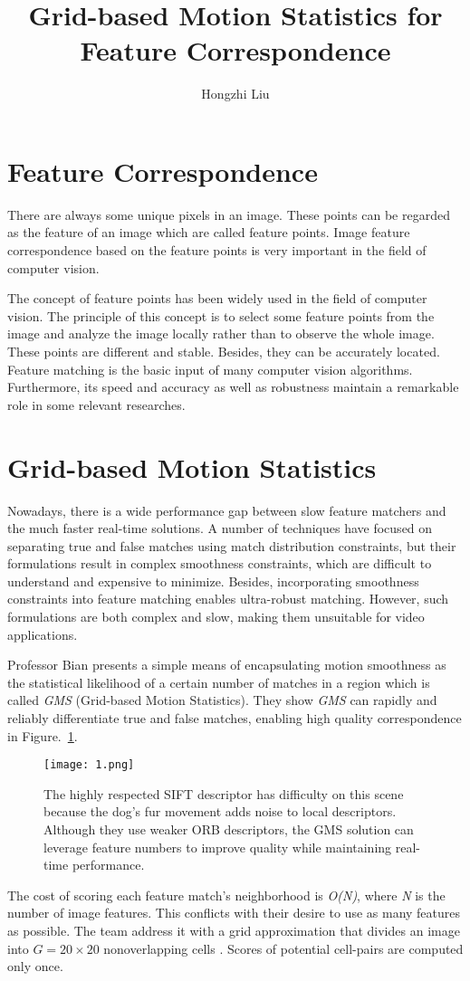 \documentclass[twocolumn]{article}
\author{Hongzhi Liu}
\title{Grid-based Motion Statistics for Feature Correspondence}
\begin{document}
	\maketitle
	\par
	\section{Feature Correspondence}
	There are always some unique pixels in an image. These points can be regarded as the feature of an image which are called feature points. Image feature correspondence based on the feature points is very important in the field of computer vision.
	
	The concept of feature points has been widely used in the field of computer vision. The principle of this concept is to select some feature points from the image and analyze the image locally rather than to observe the whole image. These points are different and stable. Besides, they can be accurately located. Feature matching is the basic input of many computer vision algorithms. Furthermore, its speed and accuracy as well as robustness maintain a remarkable role in some relevant researches. 
	
    \section{Grid-based Motion Statistics}
	Nowadays, there is a wide performance gap between slow feature matchers and the much faster real-time solutions. A number of techniques have focused on separating true and false matches using match distribution constraints, but their formulations result in complex smoothness constraints, which are difficult to understand and expensive to minimize. Besides, incorporating smoothness constraints into feature matching enables ultra-robust matching. However, such formulations are both complex and slow, making them unsuitable for video applications.
	
	Professor Bian presents a simple means of encapsulating motion smoothness as the statistical likelihood of a certain number of matches in a region which is called \emph{GMS} (Grid-based Motion Statistics). They show \emph{GMS} can rapidly and reliably differentiate true and false matches, enabling high quality correspondence in Figure.~\ref{GMS}.
	\begin{figure}[ht]
		\centering
		\texttt{[image: 1.png]}
		\caption{The highly respected SIFT \cite{Lowe2004Distinctive} descriptor has difficulty on this scene because the dog’s fur movement adds noise to local descriptors. Although they use weaker ORB descriptors, the GMS solution can leverage feature numbers to improve quality while maintaining real-time performance.}\label{GMS}
	\end{figure}
	The cost of scoring each feature match's neighborhood is \emph{O(N)}, where \emph{N} is the number of image features. This conflicts with their desire to use as many features as possible. The team address it with a grid approximation that divides an image into $G = 20 \times 20 $ nonoverlapping cells \cite{Bian2017GMS}. Scores of potential cell-pairs are computed
	only once.  
	
\end{document}
